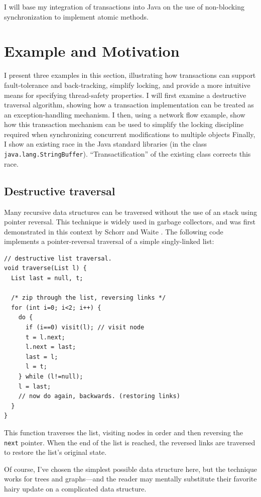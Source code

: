 \documentclass[12pt,oneside]{article}
\newcommand{\subsecput}[2]{\subsection{#2}\label{sec:#1}}
\begin{document}
I will base my integration of transactions into Java on the use of
non-blocking synchronization to implement atomic methods.

\section{Example and Motivation}
I present three examples in this section, illustrating how
transactions can support fault-tolerance and back-tracking,
simplify locking, and provide a more intuitive
means for specifying thread-safety properties.
I will first examine a destructive traversal algorithm, showing how a
transaction implementation can be treated as an exception-handling
mechanism.   I then, using a network flow example, show how this
transaction mechanism can be used to simplify
the locking discipline required when synchronizing concurrent
modifications to multiple objects
Finally, I show an existing race in the Java standard libraries (in 
the class \texttt{java.lang.StringBuffer}).  ``Transactification'' of
the existing class corrects this race.

\subsecput{destruct}{Destructive traversal}
Many recursive data structures can be traversed without the use of an
stack using pointer reversal.  This technique is widely used in
garbage collectors, and was first demonstrated in this context by
Schorr and Waite \cite{SchorrWa67}.  The following code implements a
pointer-reversal traversal of a simple singly-linked list:
 \par {\footnotesize\samepage
\begin{verbatim}
// destructive list traversal.
void traverse(List l) {
  List last = null, t;
  
  /* zip through the list, reversing links */
  for (int i=0; i<2; i++) {
    do {
      if (i==0) visit(l); // visit node
      t = l.next;
      l.next = last;
      last = l;
      l = t;
    } while (l!=null);
    l = last;
    // now do again, backwards. (restoring links)
  }
}
\end{verbatim}
}
This function traverses the list, visiting nodes in order and then
reversing the {\tt next} pointer.  When the end of the list is
reached, the reversed links are traversed to restore the list's original
state.  

Of course, I've chosen the simplest possible data structure here, but
the technique works for trees and graphs---and the reader may mentally
substitute their favorite hairy update on a complicated data
structure.
\end{document}
